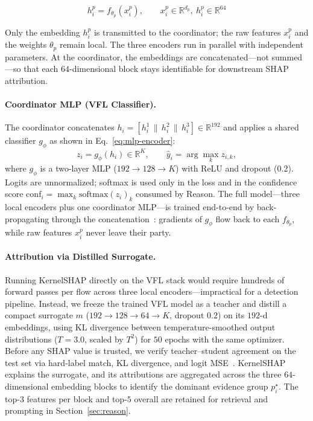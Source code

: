 \documentclass[10pt, conference]{IEEEtran}
\begin{document}
\begin{equation}
h_i^p = f_{\theta_p}(x_i^p), \qquad x_i^p \in \mathbb{R}^{d_p},\ h_i^p \in \mathbb{R}^{64}
\label{eq:local-encoder}
\end{equation}

Only the embedding $h_i^p$ is transmitted to the coordinator; the raw features $x_i^p$ and the weights $\theta_p$ remain local. The three encoders run in parallel with independent parameters. At the coordinator, the embeddings are concatenated---not summed---so that each $64$-dimensional block stays identifiable for downstream SHAP attribution.

\paragraph{Coordinator MLP (VFL Classifier).}
The coordinator concatenates $h_i = [h_i^1 \,\|\, h_i^2 \,\|\, h_i^3] \in \mathbb{R}^{192}$ and applies a shared classifier $g_\phi$  as shown in Eq.~\eqref{eq:mlp-encoder}:
\begin{equation}
z_i = g_\phi(h_i) \in \mathbb{R}^K, \qquad \hat{y}_i = \arg\max_k z_{i,k},
\label{eq:mlp-encoder}
\end{equation}
where $g_\phi$ is a two-layer MLP ($192 \to 128 \to K$) with ReLU and dropout (0.2). Logits are unnormalized; softmax is used only in the loss and in the confidence score $\mathrm{conf}_i = \max_k \mathrm{softmax}(z_i)_k$ consumed by Reason. The full model---three local encoders plus one coordinator MLP---is trained end-to-end by back-propagating through the concatenation~\cite{liu2024vfl}: gradients of $g_\phi$ flow back to each $f_{\theta_p}$, while raw features $x_i^p$ never leave their party.

\paragraph{Attribution via Distilled Surrogate.}
Running KernelSHAP directly on the VFL stack would require hundreds of forward passes per flow across three local encoders---impractical for a detection pipeline. Instead, we freeze the trained VFL model as a teacher and distill a compact surrogate $m$ ($192 \to 128 \to 64 \to K$, dropout $0.2$) on its $192$-d embeddings, using KL divergence between temperature-smoothed output distributions ($T=3.0$, scaled by $T^2$) for $50$ epochs with the same optimizer. Before any SHAP value is trusted, we verify teacher--student agreement on the test set via hard-label match, KL divergence, and logit MSE~\cite{wu2023falcon}. KernelSHAP explains the surrogate, and its attributions are
aggregated across the three $64$-dimensional embedding blocks
to identify the dominant evidence group $p_i^{\star}$.
The top-$3$ features per block and top-$5$ overall are retained
for retrieval and prompting in Section~\ref{sec:reason}.
\end{document}
